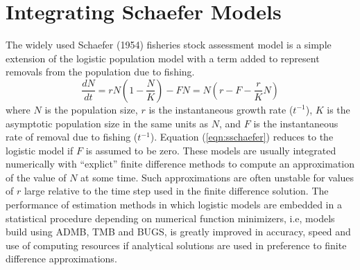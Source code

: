 \section{Integrating Schaefer Models}
\label{sec:schaefer}
The widely used Schaefer (1954) fisheries stock assessment model 
is a simple
extension of the logistic population model with a term added to
represent removals from the population due to fishing.
\begin{equation}
\label{eqn:sschaefer}
\frac{dN}{dt} = rN(1-\frac{N}{K}) - FN = N(r-F-\frac{r}{K}N)
\end{equation}
where $N$ is the population size,
$r$ is the instantaneous growth rate ($t^{-1}$),
$K$ is the asymptotic population size in the same units as $N$,
and $F$ is the instantaneous rate of removal due to fishing ($t^{-1}$).
Equation (\ref{eqn:sschaefer}) reduces to the logistic model
if $F$ is assumed to be zero.
These models are usually integrated numerically with
``explict'' finite difference methods to compute an approximation 
of the value of $N$ at some time. 
Such approximations are often unstable for 
values of $r$ large relative to the time step used in the finite
difference solution.
The performance of estimation methods in which logistic models
are embedded in a statistical procedure depending on numerical function
minimizers, i.e, models build using ADMB, TMB and BUGS,
is greatly improved in accuracy, speed and use of
computing resources if analytical solutions are used in preference
to finite difference approximations. 

